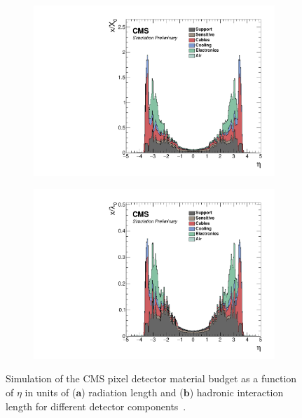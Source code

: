 \begin{figure}[h]
    \centering
    \begin{subfigure}[b]{0.49\textwidth}
        \centering
        \includegraphics[width=\textwidth]{Figures/Chapter3/Material_Budget1.pdf}
        \caption{}
    \end{subfigure}
    \begin{subfigure}[b]{0.49\textwidth}
        \centering
        \includegraphics[width=\textwidth]{Figures/Chapter3/Material_Budget2.pdf}
        \caption{}
    \end{subfigure}
\caption{Simulation of the CMS pixel detector material budget as a function of $\eta$ in units of ($\textbf{a}$) radiation length and ($\textbf{b}$) hadronic interaction length for different detector components~\cite{TrackerMaterialBudget_Pixel}.}
\label{Figure:Chapter3_Tracker_MaterialBudget}
\end{figure}


